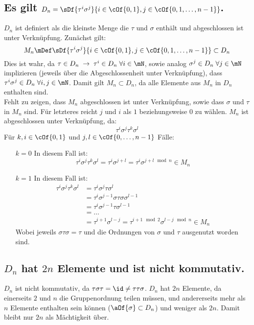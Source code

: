 \subsection{Es gilt $D_n = \sDf{\tau^i\sigma^j}{i\in\cOf{0,1}, j\in\cOf{0,1,\dots,n-1}}$.}
$D_n$ ist definiert als die kleinste Menge die $\tau$ und $\sigma$ enthält und abgeschlossen ist unter Verknüpfung. Zunächst gilt:
\begin{equation}
	M_n \mDef \sDf{\tau^i\sigma^j}{i\in\cOf{0,1}, j\in\cOf{0,1,\dots,n-1}} \subset D_n
\end{equation}
Dies ist wahr, da $\tau\in D_n\;\rightarrow\;\tau^i\in D_n\;\forall i \in \mN$, sowie analog $\sigma^j\in D_n\;\forall j \in \mN$ implizieren (jeweils über die Abgeschlossenheit unter Verknüpfung), dass $\tau^i\sigma^j\in D_n\;\forall i,j\in\mN$. Damit gilt $M_n \subset D_n$, da alle Elemente aus $M_n$ in $D_n$ enthalten sind.\\
Fehlt zu zeigen, dass $M_n$ abgeschlossen ist unter Verknüpfung, sowie dass $\sigma$ und $\tau$ in $M_n$ sind. Für letzteres reicht $j$ und $i$ als $1$ beziehungsweise $0$ zu wählen. $M_n$ ist abgeschlossen unter Verknüpfung, da:
\begin{equation}
	\tau^i\sigma^j\tau^k\sigma^l
\end{equation}
Für $k,i\in\cOf{0,1}$ und $j,l\in\cOf{0,\dots,n-1}$ Fälle:
\begin{enumerate}
	\item[$k=0$] In diesem Fall ist:
	\begin{equation}
		\tau^i\sigma^j\tau^k\sigma^l = \tau^i\sigma^{j+l} = \tau^i\sigma^{j+l \mod n} \in M_n
	\end{equation}
	\item[$k=1$] In diesem Fall ist:
	\begin{align}
		\tau^i\sigma^j\tau^k\sigma^l & = \tau^i\sigma^j\tau\sigma^l\\
		& = \tau^i\sigma^{j-1}\sigma\tau\sigma\sigma^{l-1}\\
		& = \tau^i\sigma^{j-1}\tau\sigma^{l-1}\\
		& = \dots \\
		& = \tau^{i+1}\sigma^{l-j} = \tau^{i+1\!\mod 2}\sigma^{l-j\!\mod n} \in M_n
	\end{align}
	Wobei jeweils $\sigma\tau\sigma = \tau$ und die Ordnungen von $\sigma$ und $\tau$ ausgenutzt worden sind.
\end{enumerate}

\subsection{$D_n$ hat $2n$ Elemente und ist nicht kommutativ.}
$D_n$ ist nicht kommutativ, da $\tau\sigma\tau = \id \neq \tau\tau\sigma$. $D_n$ hat $2n$ Elemente, da einerseits $2$ und $n$ die Gruppenordnung teilen müssen, und andererseits mehr als $n$ Elemente enthalten sein können ($\aOf{\sigma} \subset D_n$) und weniger als $2n$. Damit bleibt nur $2n$ als Mächtigkeit über.
